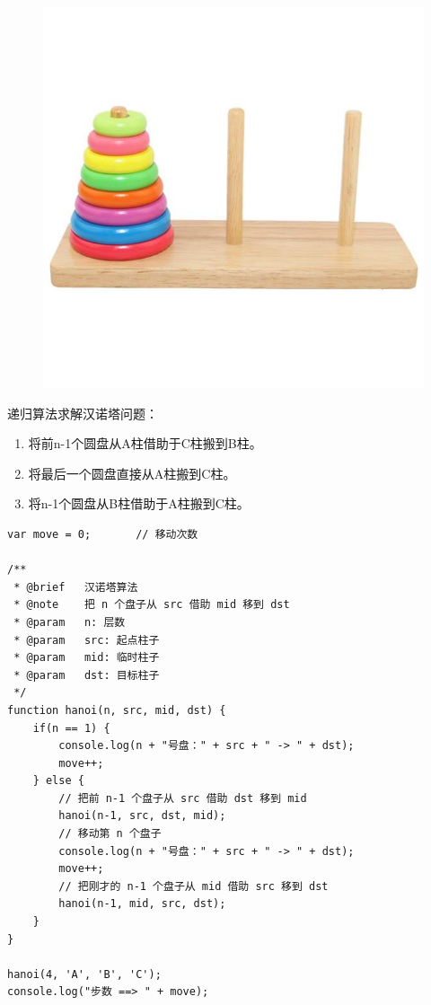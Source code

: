 \begin{figure}[H]
	\centering
	\includegraphics[scale=0.4]{img/C13/13-3/7.png}
\end{figure}

递归算法求解汉诺塔问题：

\begin{enumerate}
	\item 将前n-1个圆盘从A柱借助于C柱搬到B柱。
	\item 将最后一个圆盘直接从A柱搬到C柱。
	\item 将n-1个圆盘从B柱借助于A柱搬到C柱。
\end{enumerate}

\begin{lstlisting}[style=htmlcssjs]
var move = 0;       // 移动次数

/**
 * @brief   汉诺塔算法
 * @note    把 n 个盘子从 src 借助 mid 移到 dst
 * @param   n: 层数
 * @param   src: 起点柱子
 * @param   mid: 临时柱子
 * @param   dst: 目标柱子
 */
function hanoi(n, src, mid, dst) {
    if(n == 1) {
        console.log(n + "号盘：" + src + " -> " + dst);
        move++;
    } else {
        // 把前 n-1 个盘子从 src 借助 dst 移到 mid
        hanoi(n-1, src, dst, mid);
        // 移动第 n 个盘子
        console.log(n + "号盘：" + src + " -> " + dst);
        move++;
        // 把刚才的 n-1 个盘子从 mid 借助 src 移到 dst
        hanoi(n-1, mid, src, dst);
    }
}

hanoi(4, 'A', 'B', 'C');
console.log("步数 ==> " + move);
\end{lstlisting}

